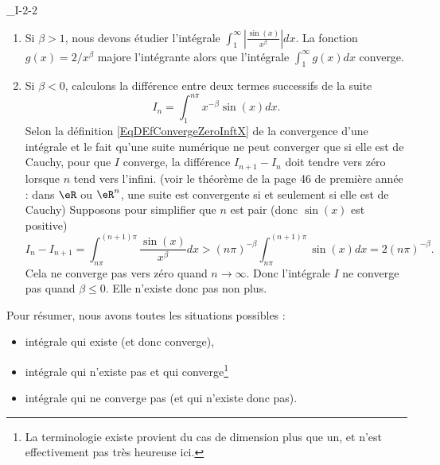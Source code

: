 

\begin{corrige}{_I-2-2}

\begin{enumerate}
\item Si $\beta>1$, nous devons étudier l'intégrale $\int_1^{\infty}\left| \frac{ \sin(x) }{ x^{\beta} }  \right|dx$. La fonction $g(x)=2/x^{\beta}$ majore l'intégrante alors que l'intégrale $\int_1^{\infty}g(x)dx$ converge.

\item Si $\beta<0$, calculons la différence entre deux termes successifs de la suite
\begin{equation}		\label{EqInACaclDiff}
	I_n=\int_1^{n\pi}x^{-\beta}\sin(x)dx.
\end{equation}
Selon la définition \eqref{EqDEfConvergeZeroInftX} de la convergence d'une intégrale et le fait qu'une suite numérique ne peut converger que si elle est de Cauchy, pour que $I$ converge, la différence $I_{n+1}-I_n$ doit tendre vers zéro lorsque $n$ tend vers l'infini. (voir le théorème de la page 46 de première année : dans $\eR$ ou $\eR^n$, une suite est convergente si et seulement si elle est de Cauchy) Supposons pour simplifier que $n$ est pair (donc $\sin(x)$ est positive)
\begin{equation}
	I_n-I_{n+1}=\int_{n\pi}^{(n+1)\pi}\frac{ \sin(x) }{ x^{\beta} }dx>(n\pi)^{-\beta}\int_{n\pi}^{(n+1)\pi}\sin(x)dx=2(n\pi)^{-\beta}.
\end{equation}
Cela ne converge pas vers zéro quand $n\to\infty$. Donc l'intégrale $I$ ne converge pas quand $\beta\leq 0$. Elle n'existe donc pas non plus.


\end{enumerate}
Pour résumer, nous avons toutes les situations possibles :
\begin{itemize}
\item intégrale qui existe (et donc converge),
\item intégrale qui n'existe pas et qui converge\footnote{La terminologie \og existe\fg{} provient du cas de dimension plus que un, et n'est effectivement pas très heureuse ici.}
\item intégrale qui ne converge pas (et qui n'existe donc pas).
\end{itemize}

\end{corrige}
